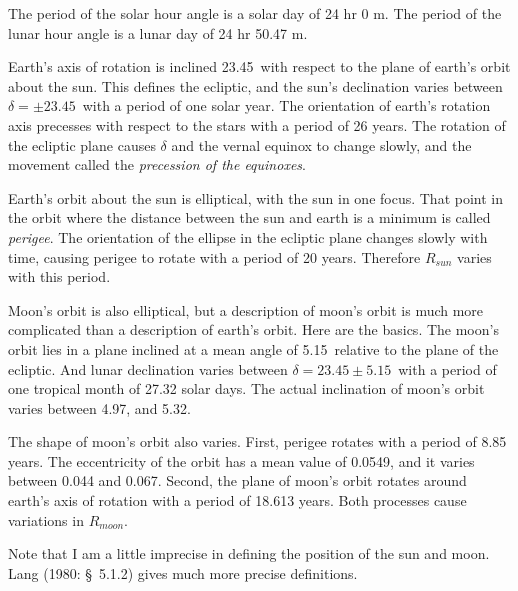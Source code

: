 The period of the solar hour angle is a solar day of 24 hr 0 m. The
period of the lunar hour angle is a lunar day of 24 hr 50.47 m.

Earth's axis of rotation is inclined 23.45\degrees\ with respect to
the plane of earth's orbit about the sun. This defines the ecliptic,
and the sun's declination varies between $\delta = \pm
23.45$\degrees\ with a period of one solar year. The orientation of
earth's rotation axis precesses with respect to the stars with a
period of 26 years. The rotation of the ecliptic plane
causes $\delta$ and the vernal equinox to change slowly, and the
movement called the \textit{precession of the equinoxes}.
  

Earth's orbit about the sun is elliptical, with the sun in one
focus. That point in the orbit where the distance between the sun and
earth is a minimum is called \textit{perigee}.    
 The orientation of the ellipse in the ecliptic
plane changes slowly with time, causing perigee to rotate with a
period of 20 years. Therefore $R_{sun}$ varies with this
period.

Moon's orbit is also elliptical, but a description of moon's orbit is
much more complicated than a description of earth's orbit. Here are
the basics. The moon's orbit lies in a plane inclined at a mean angle
of 5.15\degrees\ relative to the plane of the ecliptic. And lunar
declination varies between $\delta = 23.45 \pm 5.15$\degrees\ with a
period of one tropical month of 27.32 solar days. The actual
inclination of moon's orbit varies between 4.97\degrees, and
5.32\degrees.

The shape of moon's orbit also varies. First, perigee rotates with a
period of 8.85 years. The eccentricity of the orbit has a mean value
of 0.0549, and it varies between 0.044 and 0.067. Second, the plane of
moon's orbit rotates around earth's axis of rotation with a period of
18.613 years. Both processes cause variations in $R_{moon}$.

Note that I am a little imprecise in defining the position of the sun
and moon.  Lang (1980: \S \ 5.1.2) gives much more precise
definitions.

